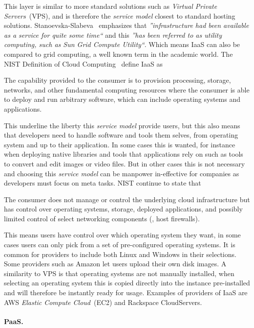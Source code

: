 This layer is similar to more standard solutions such as \emph{Virtual Private Servers}~(VPS),
and is therefore the \emph{service model} closest to standard hosting solutions.
Stanoevska-Slabeva~\cite{introduction:wozniak10} emphasizes that
\emph{''infrastructure had been available as a service for quite some time``} and this 
\emph{''has been referred to as utility computing, such as Sun Grid Compute Utility``}.
Which means IaaS can also be compared to grid computing, 
a well known term in the academic world.
The NIST Definition of Cloud Computing~\cite{nist:mell11} define IaaS as
\epigraph{The capability provided to the consumer is to provision 
  processing, storage, networks, and other fundamental computing resources where the 
  consumer is able to deploy and run arbitrary software, which can include operating 
  systems and applications.
}{}
This underline the liberty this \emph{service model} provide users, but this also means
that developers need to handle software and tools them selves, from operating system and
up to their application. In some cases this is wanted, for instance when deploying 
native libraries and tools that applications rely on such as tools to convert and edit
images or video files. But in other cases this is not necessary and choosing this \emph{service model}
can be manpower in-effective for companies as developers must focus on meta tasks.
NIST continue to state that 
\epigraph{The consumer does not manage or control the underlying cloud 
  infrastructure but has control over operating systems, storage, deployed applications, and 
  possibly limited control of select networking components (\eg, host firewalls).
}{}
This means users have control over which operating system they want, in some cases users
can only pick from a set of pre-configured operating systems.
It is common for providers to include both Linux and Windows in their selections.
Some providers such as Amazon let users upload their own disk images.
A similarity to VPS is that operating systems are not manually installed,
when selecting an operating system this is copied directly into the instance pre-installed
and will therefore be instantly ready for usage.
Examples of providers of IaaS are AWS \emph{Elastic Compute Cloud}~(EC2) and Rackspace CloudServers.

\paragraph{PaaS.}

